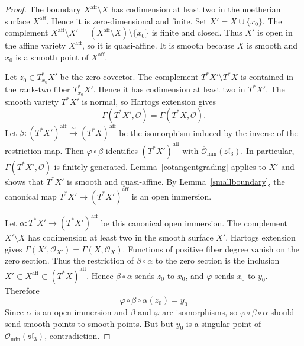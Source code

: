 \documentclass[12pt]{article}
\theoremstyle{definition}
\newcommand{\OO}{\mathcal O}
\newcommand{\Ominbar}{\overline{\mathcal O}_{\min}}
\newcommand{\aff}{\mathrm{aff}}
\begin{document}
\begin{proof}
    The boundary $X^\aff\setminus X$ has codimension at least two in the noetherian surface $X^\aff$. Hence it is zero-dimensional and finite. Set $X'=X\cup\{x_0\}$. The complement $X^\aff\setminus X'=(X^\aff\setminus X)\setminus\{x_0\}$ is finite and closed. Thus $X'$ is open in the affine variety $X^\aff$, so it is quasi-affine. It is smooth because $X$ is smooth and $x_0$ is a smooth point of $X^\aff$.

    Let $z_0\in T^*_{x_0}X'$ be the zero covector. The complement $T^*X'\setminus T^*X$ is contained in the rank-two fiber $T^*_{x_0}X'$. Hence it has codimension at least two in $T^*X'$. The smooth variety $T^*X'$ is normal, so Hartogs extension gives
    \[
        \Gamma(T^*X',\OO)=\Gamma(T^*X,\OO).
    \]
    Let $\beta:(T^*X')^\aff\xrightarrow{\sim}(T^*X)^\aff$ be the isomorphism induced by the inverse of the restriction map. Then $\varphi\circ\beta$ identifies $(T^*X')^\aff$ with $\Ominbar(\mathfrak{sl}_3)$.
    In particular, $\Gamma(T^*X',\OO)$ is finitely generated. Lemma~\ref{cotangentgrading} applies to $X'$ and shows that $T^*X'$ is smooth and quasi-affine. By Lemma~\ref{smallboundary}, the canonical map $T^*X'\to (T^*X')^\aff$ is an open immersion.

    Let $\alpha:T^*X'\to(T^*X')^\aff$ be this canonical open immersion. The complement $X'\setminus X$ has codimension at least two in the smooth surface $X'$. Hartogs extension gives $\Gamma(X',\OO_{X'})=\Gamma(X,\OO_X)$. Functions of positive fiber degree vanish on the zero section. Thus the restriction of $\beta\circ\alpha$ to the zero section is the inclusion $X'\subset X^\aff\subset(T^*X)^\aff$. Hence $\beta\circ\alpha$ sends $z_0$ to $x_0$, and $\varphi$ sends $x_0$ to $y_0$. Therefore $$\varphi\circ\beta\circ\alpha(z_0)=y_0$$  Since $\alpha$ is an open immersion and $\beta$ and $\varphi$ are isomorphisms, so $\varphi\circ\beta\circ\alpha$ should send smooth points to smooth points. But but $y_0$ is a singular point of $\Ominbar(\mathfrak{sl}_3)$, contradiction.
\end{proof}
\end{document}
